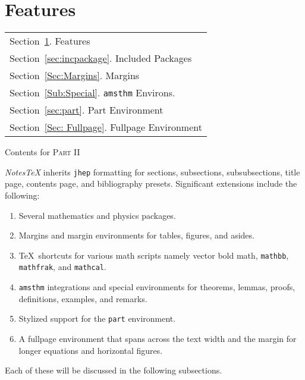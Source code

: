 \documentclass[10pt]{article}
\begin{document}
	\section{Features}\label{sec:Features}
	\begin{margintable}\vspace{1.4in}\footnotesize
		\begin{tabularx}{\marginparwidth}{|X}
		Section~\ref{sec:Features}. Features\\
		Section~\ref{sec:incpackage}. Included Packages\\
		Section~\ref{Sec:Margins}. Margins\\
		Section~\ref{Sub:Special}. \texttt{amsthm} Environs.\\
		Section~\ref{sec:part}. Part Environment\\
		Section~\ref{Sec: Fullpage}. Fullpage Environment\\
		\end{tabularx}
		\caption{Contents for \textsc{Part II}}
	\end{margintable}
	\textit{NotesTeX} inherits \texttt{jhep} formatting for sections, subsections, subsubsections, title page, contents page, and bibliography presets. Significant extensions include the following:
	\begin{enumerate}
		\item Several mathematics and physics packages.
		\item Margins and margin environments for tables, figures, and asides.
		\item \TeX\ shortcuts for various math scripts namely vector bold math, \lstinline{mathbb},\\ \lstinline{mathfrak}, and \lstinline{mathcal}.
		\item \lstinline{amsthm} integrations and special environments for theorems, lemmas, proofs, definitions, examples, and remarks.\
		\item Stylized support for the \lstinline{part} environment.
		\item A fullpage environment that spans across the text width and the margin for longer equations and horizontal figures.
	\end{enumerate}
	Each of these will be discussed in the following subsections.

	\newpage
\end{document}
